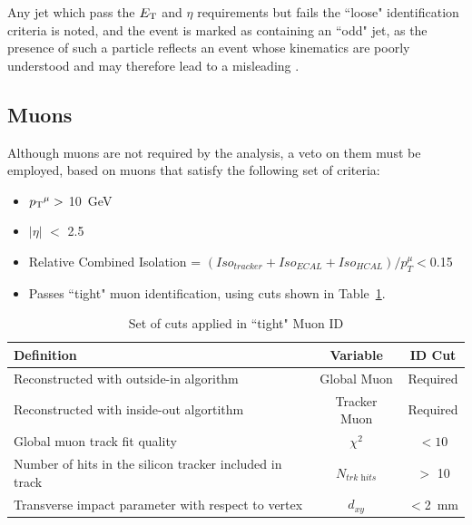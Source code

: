 Any jet which pass the ${E_{\text T}}$ and $\eta$ requirements but fails the ``loose" identification criteria is noted, and the event is marked as containing an ``odd" jet, as the presence of such a particle reflects an event whose kinematics are poorly understood and may therefore lead to a misleading \MHT.

\subsection{Muons} 
Although muons are not required by the analysis, a veto on them must be employed, based on muons that satisfy the following set of criteria:
\begin{itemize}
\item ${p_{\text T}}^{\mu} >$ 10~GeV
\item $| \eta|$ $<$ 2.5
\item Relative Combined Isolation = $(Iso_{tracker} + Iso_{ECAL} + Iso_{HCAL}) / p^{\mu}_{T} < $0.15\footnotemark
\item Passes ``tight" muon identification, using cuts shown in Table~\ref{tab:muid}.
\end{itemize}

\begin{table}[htbp]
\centering
\begin{tabular}{ m{8.9cm}  c  c }
\hline
\hline
 \centering Definition & Variable & ID Cut \\
\hline
\hline
 Reconstructed with outside-in algorithm & Global Muon & Required\\
Reconstructed with inside-out algortithm & Tracker Muon & Required\\
 Global muon track fit quality & $\chi^{2}$ & $< 10$ \\ 
Number of hits in the silicon tracker included in track & $N_{\textit{trk hits}}$ &$ >$ 10\\
Transverse impact parameter with respect to vertex & $d_{xy}$ & $< $2~mm\\
\hline
\end{tabular}
\caption{\label{tab:muid} Set of cuts applied in ``tight" Muon ID}
\end{table}



